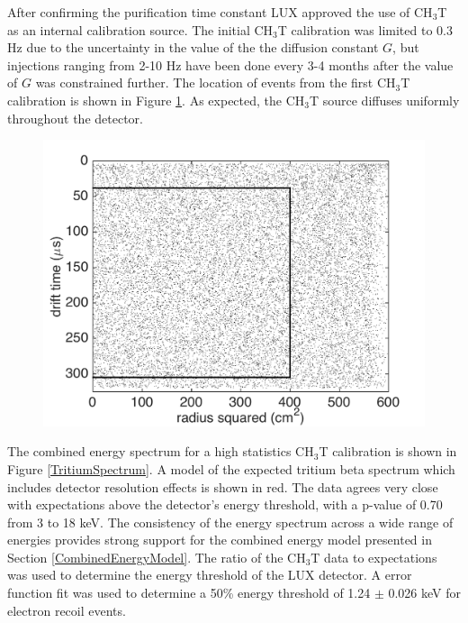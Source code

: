 \documentclass[a4paper,12pt]{article}
\begin{document}
{After confirming the purification time constant LUX approved the use of CH$_3$T as an internal calibration source.  The initial CH$_3$T calibration was limited to 0.3 Hz due to the uncertainty in the value of the the diffusion constant $G$, but injections ranging from 2-10 Hz have been done every 3-4 months after the value of $G$ was constrained further.  The location of events from the first CH$_3$T calibration is shown in Figure \ref{TritiumSpatialDist}. As expected, the CH$_3$T source diffuses uniformly throughout the detector.  
\begin{figure} [!h]
\includegraphics[scale=.5]{TritiumRvZ.pdf} 
\label{TritiumSpatialDist}
\end{figure}

The combined energy spectrum for a high statistics CH$_3$T calibration is shown in Figure \ref{TritiumSpectrum}.  A model of the expected tritium beta spectrum which includes detector resolution effects is shown in red.  The data agrees very close with expectations above the detector's energy threshold, with a p-value of 0.70 from 3 to 18 keV.  The consistency of the energy spectrum across a wide range of energies provides strong support for the combined energy model presented in Section \ref{CombinedEnergyModel}.  The ratio of the CH$_3$T data to expectations was used to determine the energy threshold of the LUX detector.  A error function fit was used to determine a 50\% energy threshold of 1.24 $\pm$ 0.026 keV for electron recoil events.

}
\end{document}
